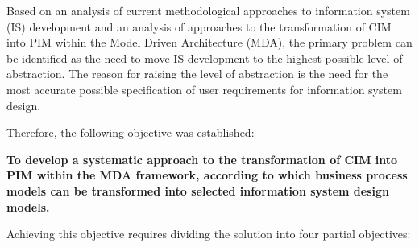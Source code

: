 Based on an analysis of current methodological approaches to information system (IS) development and an analysis of approaches to the transformation of CIM into PIM within the Model Driven Architecture (MDA), the primary problem can be identified as the need to move IS development to the highest possible level of abstraction. The reason for raising the level of abstraction is the need for the most accurate possible specification of user requirements for information system design. 

Therefore, the following objective was established: 

\textbf{To develop a systematic approach to the transformation of CIM into PIM within the MDA framework, according to which business process models can be transformed into selected information system design models.} 

Achieving this objective requires dividing the solution into four partial objectives: 


